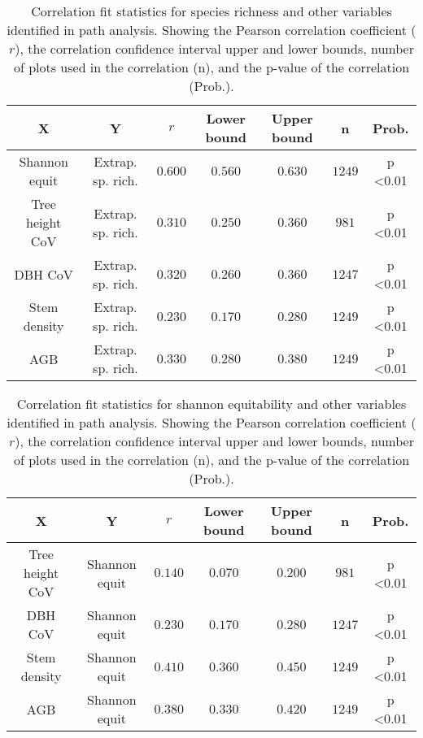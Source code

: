 \begin{table}[H]
\centering
\begin{tabular}{ccccccc}
\hline
X & Y & $r$ & Lower bound & Upper bound & n & Prob. \\ 
\hline
Shannon equit & Extrap. sp. rich. & $0.600$ & $0.560$ & $0.630$ & $1249$ & p \textless 0.01 \\ 
Tree height CoV & Extrap. sp. rich. & $0.310$ & $0.250$ & $0.360$ & $981$ & p \textless 0.01 \\ 
DBH CoV & Extrap. sp. rich. & $0.320$ & $0.260$ & $0.360$ & $1247$ & p \textless 0.01 \\ 
Stem density & Extrap. sp. rich. & $0.230$ & $0.170$ & $0.280$ & $1249$ & p \textless 0.01 \\ 
AGB & Extrap. sp. rich. & $0.330$ & $0.280$ & $0.380$ & $1249$ & p \textless 0.01 \\ 
\hline
\end{tabular}
\caption[Species richness correlation fit statistics]{Correlation fit statistics for species richness and other variables identified in path analysis. Showing the Pearson correlation coefficient ($r$), the correlation confidence interval upper and lower bounds, number of plots used in the correlation (n), and the p-value of the correlation (Prob.).} 
\label{befr:corr_ci:rich}
\end{table}

\begin{table}[H]
\centering
\begin{tabular}{ccccccc}
\hline
X & Y & $r$ & Lower bound & Upper bound & n & Prob. \\ 
\hline
Tree height CoV & Shannon equit & $0.140$ & $0.070$ & $0.200$ & $981$ & p \textless 0.01 \\ 
DBH CoV & Shannon equit & $0.230$ & $0.170$ & $0.280$ & $1247$ & p \textless 0.01 \\ 
Stem density & Shannon equit & $0.410$ & $0.360$ & $0.450$ & $1249$ & p \textless 0.01 \\ 
AGB & Shannon equit & $0.380$ & $0.330$ & $0.420$ & $1249$ & p \textless 0.01 \\ 
\hline
\end{tabular}
\caption[Shannon equitability correlation fit statistics]{Correlation fit statistics for shannon equitability and other variables identified in path analysis. Showing the Pearson correlation coefficient ($r$), the correlation confidence interval upper and lower bounds, number of plots used in the correlation (n), and the p-value of the correlation (Prob.).} 
\label{befr:corr_ci:shannon_equit}
\end{table}

